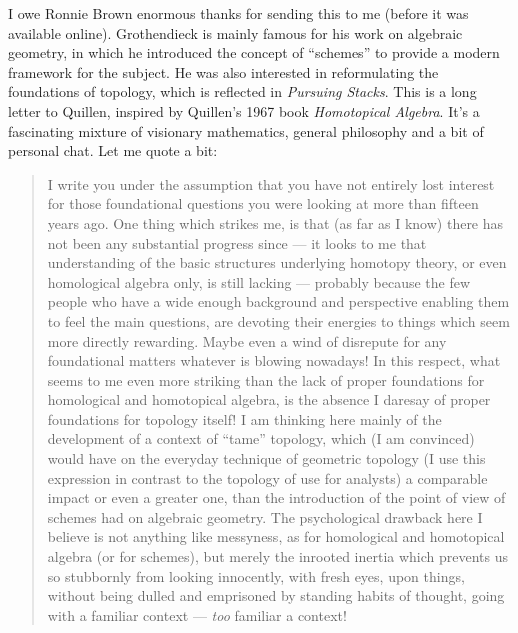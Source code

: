 \documentclass{article}
\def\tightlist{}
\renewcommand{\texttt}[1]{%
  \begingroup
  \ttfamily
  \begingroup\lccode`~=`/\lowercase{\endgroup\def~}{/\discretionary{}{}{}}%
  \begingroup\lccode`~=`[\lowercase{\endgroup\def~}{[\discretionary{}{}{}}%
  \begingroup\lccode`~=`.\lowercase{\endgroup\def~}{.\discretionary{}{}{}}%
  \catcode`/=\active\catcode`[=\active\catcode`.=\active
  \scantokens{#1\noexpand}%
  \endgroup
}
\begin{document}
\noindent
I owe Ronnie Brown enormous thanks for sending this to me (before it was
available online).   Grothendieck
is mainly famous for his work on algebraic geometry, in which he
introduced the concept of ``schemes'' to provide a modern framework for
the subject. He was also interested in reformulating the foundations of
topology, which is reflected in \emph{Pursuing Stacks}. This is a long
letter to Quillen, inspired by Quillen's 1967 book \emph{Homotopical
Algebra}. It's a fascinating mixture of visionary mathematics, general
philosophy and a bit of personal chat. Let me quote a bit:

\begin{quote}
I write you under the assumption that you have not entirely lost
interest for those foundational questions you were looking at more than
fifteen years ago. One thing which strikes me, is that (as far as I
know) there has not been any substantial progress since --- it looks to
me that understanding of the basic structures underlying homotopy
theory, or even homological algebra only, is still lacking --- probably
because the few people who have a wide enough background and perspective
enabling them to feel the main questions, are devoting their energies to
things which seem more directly rewarding. Maybe even a wind of
disrepute for any foundational matters whatever is blowing nowadays! In
this respect, what seems to me even more striking than the lack of
proper foundations for homological and homotopical algebra, is the
absence I daresay of proper foundations for topology itself! I am
thinking here mainly of the development of a context of ``tame''
topology, which (I am convinced) would have on the everyday technique of
geometric topology (I use this expression in contrast to the topology of
use for analysts) a comparable impact or even a greater one, than the
introduction of the point of view of schemes had on algebraic geometry.
The psychological drawback here I believe is not anything like
messyness, as for homological and homotopical algebra (or for schemes),
but merely the inrooted inertia which prevents us so stubbornly from
looking innocently, with fresh eyes, upon things, without being dulled
and emprisoned by standing habits of thought, going with a familiar
context --- \emph{too} familiar a context!
\end{quote}
\end{document}
